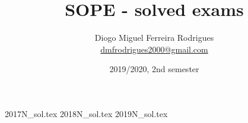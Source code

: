 \documentclass[a4paper]{book}
\title{SOPE - solved exams}
\author{Diogo Miguel Ferreira Rodrigues \\ \href{mailto:dmfrodrigues2000@gmail.com}{dmfrodrigues2000@gmail.com}}
\date{2019/2020, 2nd semester}
\begin{document}
\begingroup
	\maketitle
	\let\clearpage\relax
	\setcounter{tocdepth}{1}
	\tableofcontents
\endgroup
{2017N_sol.tex}
{2018N_sol.tex}
{2019N_sol.tex}
\end{document}
